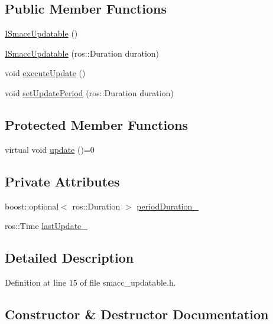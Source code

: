 \subsection*{Public Member Functions}
\begin{DoxyCompactItemize}
\item 
\hyperlink{classsmacc_1_1ISmaccUpdatable_a88355373d4b143200fd342a182cea87c}{I\+Smacc\+Updatable} ()
\item 
\hyperlink{classsmacc_1_1ISmaccUpdatable_ab864845da3d2f84c23f26af1159a2cf2}{I\+Smacc\+Updatable} (ros\+::\+Duration duration)
\item 
void \hyperlink{classsmacc_1_1ISmaccUpdatable_af6edbb3896745920ed82fd807358fa47}{execute\+Update} ()
\item 
void \hyperlink{classsmacc_1_1ISmaccUpdatable_a88f3b092a81b2d8810a9776c8c69855b}{set\+Update\+Period} (ros\+::\+Duration duration)
\end{DoxyCompactItemize}
\subsection*{Protected Member Functions}
\begin{DoxyCompactItemize}
\item 
virtual void \hyperlink{classsmacc_1_1ISmaccUpdatable_a84ee0520cbefdb1d412bed54650b028e}{update} ()=0
\end{DoxyCompactItemize}
\subsection*{Private Attributes}
\begin{DoxyCompactItemize}
\item 
boost\+::optional$<$ ros\+::\+Duration $>$ \hyperlink{classsmacc_1_1ISmaccUpdatable_ad02d9798ac5609f3ecb9fb8a46febc18}{period\+Duration\+\_\+}
\item 
ros\+::\+Time \hyperlink{classsmacc_1_1ISmaccUpdatable_ad58f7e1cd26d3fe8c3a3fccecc57feac}{last\+Update\+\_\+}
\end{DoxyCompactItemize}


\subsection{Detailed Description}


Definition at line 15 of file smacc\+\_\+updatable.\+h.



\subsection{Constructor \& Destructor Documentation}
\mbox{\label{classsmacc_1_1ISmaccUpdatable_a88355373d4b143200fd342a182cea87c}} 
